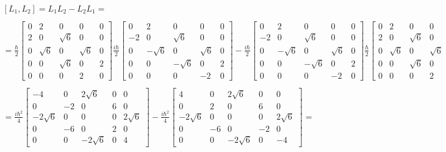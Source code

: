 \begin{equation}
  \begin{array}{c}
    [L_1,L_2] = L_1L_2-L_2L_1 =
    \\

    \\
    = \frac{\hbar}{2}\left[\begin{matrix}
      0 & 2 & 0 & 0 & 0\\
      2 & 0 & \sqrt{6} & 0 & 0\\
      0 & \sqrt{6} & 0 & \sqrt{6} & 0\\
      0 & 0 & \sqrt{6} & 0 & 2\\
      0 & 0 & 0 & 2 & 0
    \end{matrix}\right]\frac{i\hbar}{2}\left[\begin{matrix}
      0 & 2 & 0 & 0 & 0\\
      -2 & 0 & \sqrt{6} & 0 & 0\\
      0 & -\sqrt{6} & 0 & \sqrt{6} & 0\\
      0 & 0 & -\sqrt{6} & 0 & 2\\
      0 & 0 & 0 & -2 & 0
    \end{matrix}\right] - \frac{i\hbar}{2}\left[\begin{matrix}
      0 & 2 & 0 & 0 & 0\\
      -2 & 0 & \sqrt{6} & 0 & 0\\
      0 & -\sqrt{6} & 0 & \sqrt{6} & 0\\
      0 & 0 & -\sqrt{6} & 0 & 2\\
      0 & 0 & 0 & -2 & 0
    \end{matrix}\right]\frac{\hbar}{2}\left[\begin{matrix}
      0 & 2 & 0 & 0 & 0\\
      2 & 0 & \sqrt{6} & 0 & 0\\
      0 & \sqrt{6} & 0 & \sqrt{6} & 0\\
      0 & 0 & \sqrt{6} & 0 & 2\\
      0 & 0 & 0 & 2 & 0
    \end{matrix}\right] =
    \\

    \\
    = \frac{i\hbar^2}{4}\left[\begin{matrix}
      -4 & 0 & 2\sqrt{6} & 0 & 0\\
      0 & -2 & 0 & 6 & 0\\
      -2\sqrt{6} & 0 & 0 & 0 & 2\sqrt{6}\\
      0 & -6 & 0 & 2 & 0\\
      0 & 0 & -2\sqrt{6} & 0 & 4
    \end{matrix}\right] -
    \frac{i\hbar^2}{4}\left[\begin{matrix}
      4 & 0 & 2\sqrt{6} & 0 & 0\\
      0 & 2 & 0 & 6 & 0\\
      -2\sqrt{6} & 0 & 0 & 0 & 2\sqrt{6}\\
      0 & -6 & 0 & -2 & 0\\
      0 & 0 & -2\sqrt{6} & 0 & -4
    \end{matrix}\right] =
    \\


\end{array}
\end{equation}
